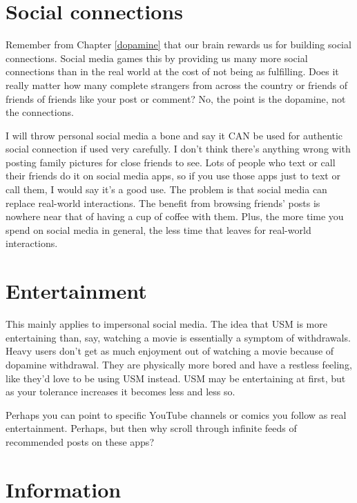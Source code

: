\documentclass[
  openany]{book}
\begin{document}
\section{Social connections}\label{social-connections}

Remember from Chapter \ref{dopamine} that our brain rewards us for building social connections. Social media games this by providing us many more social connections than in the real world at the cost of not being as fulfilling. Does it really matter how many complete strangers from across the country or friends of friends of friends like your post or comment? No, the point is the dopamine, not the connections.

I will throw personal social media a bone and say it CAN be used for authentic social connection if used very carefully. I don't think there's anything wrong with posting family pictures for close friends to see. Lots of people who text or call their friends do it on social media apps, so if you use those apps just to text or call them, I would say it's a good use. The problem is that social media can replace real-world interactions. The benefit from browsing friends' posts is nowhere near that of having a cup of coffee with them. Plus, the more time you spend on social media in general, the less time that leaves for real-world interactions.

\section{Entertainment}\label{entertainment}

This mainly applies to impersonal social media. The idea that USM is more entertaining than, say, watching a movie is essentially a symptom of withdrawals. Heavy users don't get as much enjoyment out of watching a movie because of dopamine withdrawal. They are physically more bored and have a restless feeling, like they'd love to be using USM instead. USM may be entertaining at first, but as your tolerance increases it becomes less and less so.

Perhaps you can point to specific YouTube channels or comics you follow as real entertainment. Perhaps, but then why scroll through infinite feeds of recommended posts on these apps?

\section{Information}\label{information}
\end{document}
